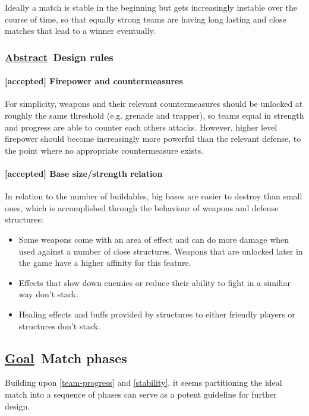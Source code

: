 \documentclass{scrartcl}
\newcommand{\goal}     [0]{\textbf{\underline{Goal}\ }}
\newcommand{\abstrac}  [0]{\textbf{\underline{Abstract}\ }}
\newcommand{\accepted} [0]{\textcolor{completed}{\textbf{[accepted] }}}
\begin{document}
Ideally a match is stable in the beginning but gets increasingly instable over the course of time, so that equally strong teams are having long lasting and close matches that lead to a winner eventually.

\subsubsection{\abstrac Design rules}

\paragraph{\accepted Firepower and countermeasures}

For simplicity, weapons and their relevant countermeasures should be unlocked at roughly the same threshold (e.g. grenade and trapper), so teams equal in strength and progress are able to counter each others attacks. However, higher level firepower should become increasingly more powerful than the relevant defense, to the point where no appropriate countermeasure exists.

\paragraph{\accepted Base size/strength relation}

In relation to the number of buildables, big bases are easier to destroy than small ones, which is accomplished through the behaviour of weapons and defense structures:

\begin{itemize}
\item Some weapons come with an area of effect and can do more damage when used against a number of close structures. Weapons that are unlocked later in the game have a higher affinity for this feature.
\item Effects that slow down enemies or reduce their ability to fight in a similiar way don't stack.
\item Healing effects and buffs provided by structures to either friendly players or structures don't stack.
\end{itemize}

\subsection{\goal Match phases}

Building upon \ref{team-progress} and \ref{stability}, it seems partitioning the ideal match into a sequence of phases can serve as a potent guideline for further design.
\end{document}

